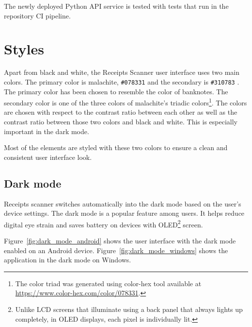 \documentclass[
  digital, %
  table,   %
  oneside, %
  lof,     %
  lot,     %
]{fithesis3}
\makeatletter
\def\testclr#1#{\@testclr{#1}}
\def\@testclr#1#2{{\fboxsep\z@\fbox{\colorbox#1{#2}{\phantom{XX}}}}}
\makeatother
\begin{document}
The newly deployed Python API service is tested with tests that run in the repository CI pipeline.

\section{Styles}
Apart from black and white, the Receipts Scanner user interface uses two main colors. The primary color is malachite, \texttt{\#078331}  and the secondary is \texttt{\#310783} . The primary color has been chosen to resemble the color of banknotes. The secondary color is one of the three colors of malachite's triadic colors\footnote{The color triad was generated using color-hex tool available at \url{https://www.color-hex.com/color/078331}.}. 
The colors are chosen with respect to the contrast ratio between each other as well as the contrast ratio between those two colors and black and white. This is especially important in the dark mode.

Most of the elements are styled with these two colors to ensure a clean and consistent user interface look.

\subsection{Dark mode}
Receipts scanner switches automatically into the dark mode based on the user's device settings. The dark mode is a popular feature among users. It helps reduce digital eye strain and saves battery on devices with OLED\footnote{Unlike LCD screens that illuminate using a back panel that always lights up completely, in OLED displays, each pixel is individually lit.} screen.

Figure~\ref{fig:dark_mode_android} shows the user interface with the dark mode enabled on an Android device. Figure~\ref{fig:dark_mode_windows} shows the application in the dark mode on Windows.
\end{document}
